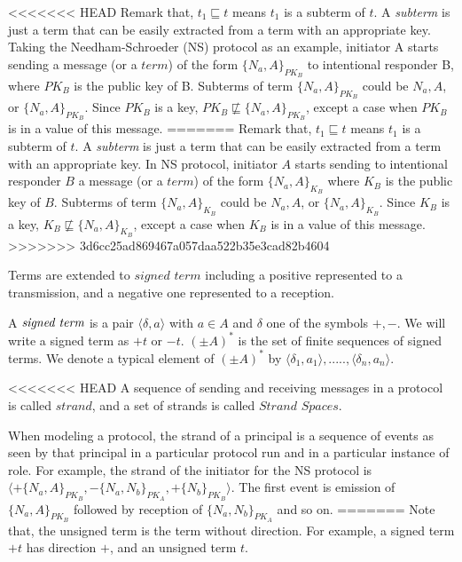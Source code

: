 <<<<<<< HEAD
Remark that, $t_1\sqsubseteq t$ means $t_1$ is a subterm of $t$. A \textit{subterm} is just a term that can be easily extracted from a term with an appropriate key. Taking the Needham-Schroeder \cite{Needham:1978:UEA:359657.359659}(NS) protocol as an example, initiator A starts sending a message (or a $term$) of the form $\{N_a,A\}_{PK_B}$ to intentional responder B, where $PK_B$ is the public key of B. Subterms of term $\{N_a,A\}_{PK_B}$ could be $N_a, A$, or $\{N_a,A\}_{PK_B}$. Since $PK_B$ is a key, $PK_B \not\sqsubseteq \{N_a,A\}_{PK_B}$, except a case when $PK_B$ is in a value of this message. 
=======
Remark that, $t_1\sqsubseteq t$ means $t_1$ is a subterm of $t$. A \textit{subterm} is just a term that can be easily extracted from a term with an appropriate key. In NS protocol, initiator $A$ starts sending to intentional responder $B$ a message (or a $term$) of the form $\{N_a,A\}_{K_B}$ where $K_B$ is the public key of $B$. Subterms of term $\{N_a,A\}_{K_B}$ could be $N_a, A$, or $\{N_a,A\}_{K_B}$. Since $K_B$ is a key, $K_B \not\sqsubseteq \{N_a,A\}_{K_B}$, except a case when $K_B$ is in a value of this message. 
>>>>>>> 3d6cc25ad869467a057daa522b35e3cad82b4604

Terms are extended to $\textit{signed term}$ including a positive represented to a transmission, and a negative one represented to a reception. 

\begin{Definition} A $\emph{signed term}$ is a pair $\langle\delta,a\rangle$ with $a \in A$ and $\delta$ one of the symbols $+,-$. We will write a signed term as $+t$ or $-t$. $(\pm A)^*$ is the set of finite sequences of signed terms. We denote a typical element of $(\pm A)^*$ by $\langle \delta_1,a_1\rangle,.....,\langle\delta_n,a_n\rangle$.
\end{Definition}

<<<<<<< HEAD
A sequence of sending and receiving messages in a protocol is called $strand$, and a set of strands is called $\textit{Strand Spaces}$. 

When modeling a protocol, the strand of a principal is a sequence of events as seen by that principal in a particular protocol run and in a particular instance of role. For example, the strand of the initiator for the NS protocol is $\langle+\{N_a,A\}_{PK_B}, -\{N_a,N_b\}_{PK_A},+\{N_b\}_{PK_B} \rangle$. The first event is emission of $\{N_a,A\}_{PK_B}$ followed by reception of $\{N_a,N_b\}_{PK_A}$ and so on. 
=======
Note that, the unsigned term is the term without direction. For example, a signed term $+t$ has direction $+$, and an unsigned term $t$. 

